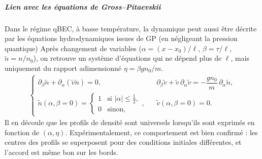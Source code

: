 \subparagraph{Lien avec les équations de Gross–Pitaevskii}
Dans le régime \gls{qBEC}, à basse température, la dynamique peut aussi être décrite par les équations hydrodynamiques issues de \gls{GP} (en négligeant la pression quantique) 
Après changement de variables ($\alpha=(x-x_0)/\ell$, $\beta=\tau/\ell$, $\tilde n=n/n_0$), on retrouve un système d’équations qui ne dépend plus de $\ell$, mais uniquement du rapport adimensionné $\eta=\beta g n_0/m$.
\begin{eqnarray*}
	\left \{ 
	\begin{array}{rcl}
		\partial_\beta \tilde n + \partial_\alpha ( \tilde v \tilde n) = 0, && \partial_\beta \tilde v + \tilde v \,\partial_\alpha \tilde v = - \dfrac{g n_0}{m}\,\partial_\alpha \tilde n, \\[6pt]
	\tilde n(\alpha,\beta=0) = 
		\begin{cases}
			1 & \text{si } |\alpha|\leq \tfrac{1}{2}, \\
			0 & \text{sinon},
		\end{cases}, && 
\tilde v(\alpha,\beta=0)=0.
	\end{array}
	\right.
\end{eqnarray*}
Il en découle que les profils de densité sont universels lorsqu’ils sont exprimés en fonction de $(\alpha,\eta)$. Expérimentalement, ce comportement est bien confirmé : les centres des profils se superposent pour des conditions initiales différentes, et l’accord est même bon sur les bords. %

